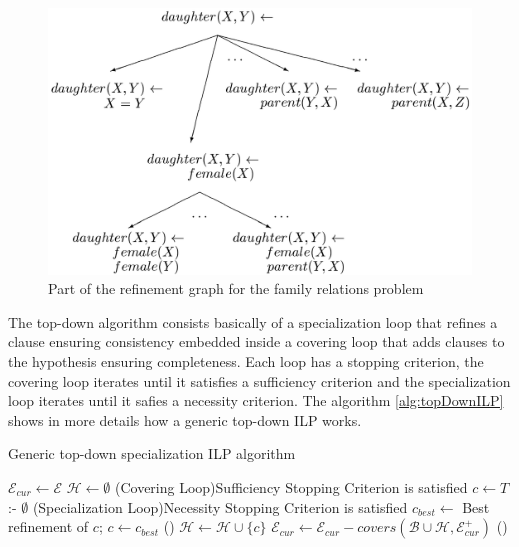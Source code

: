 \begin{figure}
\label{fig:refinementGraph}
\begin{center}
  \includegraphics[width=0.7\linewidth]{./Figures/refinementGraph.png}
\end{center}
\caption{Part of the refinement graph for the family relations problem}
\end{figure}

The top-down algorithm consists basically of a specialization loop that refines a clause ensuring consistency
embedded inside a covering loop that adds clauses to the hypothesis ensuring completeness. Each loop has a stopping
criterion, the covering loop iterates until it satisfies a sufficiency criterion and the specialization loop iterates
until it safies a necessity criterion. The algorithm \ref{alg:topDownILP} shows in more details how a generic top-down
ILP works.

\begin{algorithm}[!h]
  \caption{Generic top-down specialization ILP algorithm}
  \label{alg:topDownILP}

  $\mathcal{E}_{cur} \leftarrow \mathcal{E}$ \;
  $\mathcal{H} \leftarrow \emptyset$ \;
  \Repeat(Covering Loop){Sufficiency Stopping Criterion is satisfied} {
    $c \leftarrow T$ :- $\emptyset$ \;
    \Repeat(Specialization Loop){Necessity Stopping Criterion is satisfied} {
      $c_{best} \leftarrow$ Best refinement of $c$;
      $c \leftarrow c_{best}$ \;
    } ()
    $\mathcal{H} \leftarrow \mathcal{H} \cup \{c\}$ \;
    $\mathcal{E}_{cur} \leftarrow \mathcal{E}_{cur} - covers(\mathcal{B} \cup \mathcal{H},\mathcal{E}_{cur}^{+})$ \;
  } ()
\end{algorithm}

